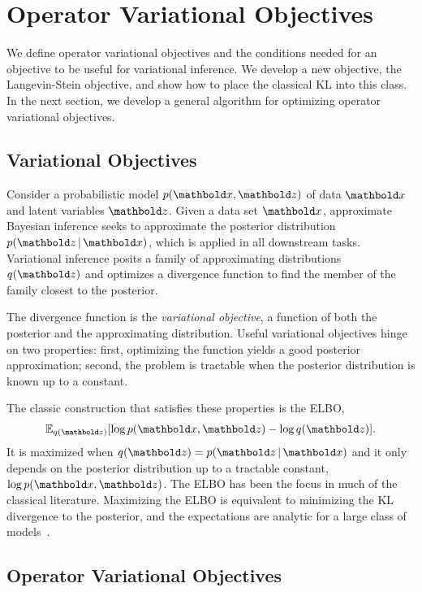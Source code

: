 
\section{Operator Variational Objectives}

We define operator variational objectives and the conditions needed
for an objective to be useful for variational inference. We develop a
new objective, the Langevin-Stein objective, and show how to place
the classical \gls{KL} into this class.  In the next section, we
develop a general algorithm for optimizing operator variational
objectives.

\subsection{Variational Objectives}

Consider a probabilistic model $p(\mbx, \mbz)$ of data $\mbx$ and
latent variables $\mbz$.  Given a data set $\mbx$, approximate Bayesian
inference seeks to approximate the posterior distribution
$p(\mbz \g \mbx)$, which is applied in all downstream tasks.
Variational inference posits a family of approximating distributions
$q(\mbz)$ and optimizes a divergence function to find the member of
the family closest to the posterior.

The divergence function is the \textit{variational objective}, a
function of both the posterior and the approximating
distribution. Useful variational objectives hinge on two properties:
first, optimizing the function yields a good posterior approximation;
second, the problem is tractable when the posterior distribution is
known up to a constant.

The classic construction that satisfies these properties is the \gls{ELBO},
\begin{align}
  \mathbb{E}_{q(\mbz)}[\log p(\mbx, \mbz) - \log q(\mbz)].
  \label{eq:elbo}
\end{align}
It is maximized when $q(\mbz)=p(\mbz \g \mbx)$ and it only depends on
the posterior distribution up to a tractable constant,
$\log p(\mbx, \mbz)$.  The \gls{ELBO} has been the focus in much of
the classical literature.  Maximizing the \gls{ELBO} is equivalent to
minimizing the \gls{KL} divergence to the posterior, and the
expectations are analytic for a large class of
models~\citep{Ghahramani:2001}.


\subsection{Operator Variational Objectives}

